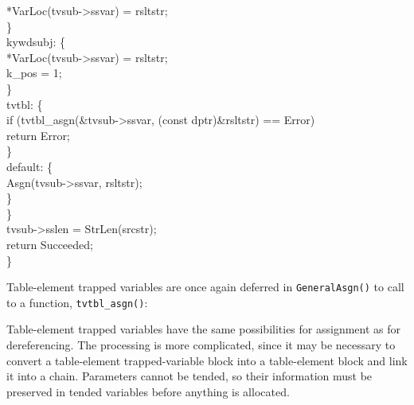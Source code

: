 {\>\>\>*VarLoc(tvsub->ssvar) = rsltstr;\\
\>\>\>\}\\
\>\>kywdsubj: \{\\
\>\>\>*VarLoc(tvsub->ssvar) = rsltstr;\\
\>\>\>k\_pos = 1;\\
\>\>\>\}\\
\>\>tvtbl: \{\\
\>\>\>if (tvtbl\_asgn(\&tvsub->ssvar, (const dptr)\&rsltstr) == Error)\\
\>\>\>\>return Error;\\
\>\>\>\}\\
\>\>default: \{\\
\>\>\>Asgn(tvsub->ssvar, rsltstr);\\
\>\>\>\}\\
\>\>\}\\
\>tvsub->sslen = StrLen(srcstr);\\
\>return Succeeded;\\
\>\}\\
}

Table-element trapped variables are once again deferred in
\texttt{GeneralAsgn()} to call to a function, \texttt{tvtbl\_asgn()}:

\goodbreak
{}

Table-element trapped variables have the same possibilities for
assignment as for dereferencing. The processing is more complicated,
since it may be necessary to convert a table-element trapped-variable
block into a table-element block and link it into a chain. Parameters
cannot be tended, so their information must be preserved in tended
variables before anything is allocated.

